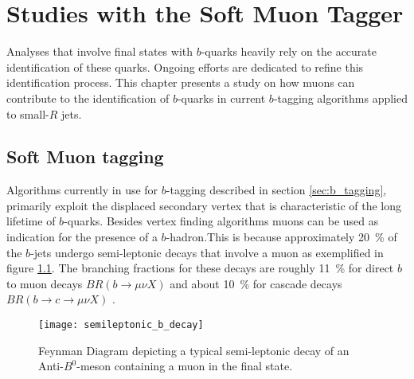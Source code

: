 \chapter{Studies with the Soft Muon Tagger}
Analyses that involve final states with $b$-quarks heavily rely on the accurate identification of these quarks. Ongoing efforts are dedicated to refine this identification process. This chapter presents a study on how muons can contribute to the identification of $b$-quarks in current $b$-tagging algorithms applied to small-$R$ jets.


\section{Soft Muon tagging}
\label{sec:SoftMuonTagging}
Algorithms currently in use for $b$-tagging described in section \ref{sec:b_tagging}, primarily exploit the displaced secondary vertex that is characteristic of the long lifetime of $b$-quarks. Besides vertex finding algorithms muons can be used as indication for the presence of a $b$-hadron.This is because approximately \qty{20}{\percent} of the $b$-jets undergo semi-leptonic decays that involve a muon as exemplified in figure \ref{fig:semileptonicDecay}. The branching fractions for these decays are roughly \qty{11}{\percent} for direct $b$ to muon decays $BR( b \rightarrow \mu \nu X )$ and about \qty{10}{\percent} for cascade decays $BR( b \rightarrow c \rightarrow \mu \nu X )$ \citep{expectedPerformanceAtlas}.
\begin{figure}[]
  \centering
  \texttt{[image: semileptonic\_b\_decay]}
  \caption{Feynman Diagram depicting a typical semi-leptonic decay of an Anti-$B^0$-meson containing a muon in the final state.}
  \label{fig:semileptonicDecay}
\end{figure}

